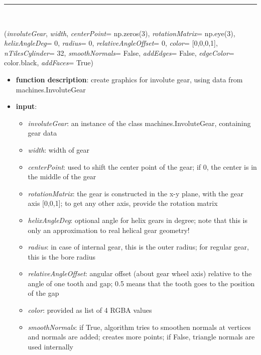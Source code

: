 \begin{itemize}[leftmargin=1.4cm]
\begin{itemize}[leftmargin=1.4cm]
\begin{itemize}[leftmargin=1.4cm]
\begin{itemize}[leftmargin=0.5cm]
\begin{itemize}[leftmargin=1.4cm]
\begin{itemize}[leftmargin=1.4cm]
\begin{itemize}[leftmargin=1.4cm]
\begin{itemize}[leftmargin=0.5cm]
\begin{itemize}[leftmargin=1.4cm]
%
\noindent\rule{8cm}{0.75pt}\vspace{1pt} \\ 
\begin{flushleft}
\label{sec:graphics:InvoluteGear}
({\it involuteGear}, {\it width}, {\it centerPoint}= np.zeros(3), {\it rotationMatrix}= np.eye(3), {\it helixAngleDeg}= 0, {\it radius}= 0, {\it relativeAngleOffset}= 0, {\it color}= [0,0,0,1], {\it nTilesCylinder}= 32, {\it smoothNormals}= False, {\it addEdges}= False, {\it edgeColor}= color.black, {\it addFaces}= True)
\end{flushleft}
\setlength{\itemindent}{0.7cm}
\begin{itemize}[leftmargin=0.7cm]
\item[--]
{\bf function description}: create graphics for involute gear, using data from machines.InvoluteGear
\item[--]
{\bf input}: \vspace{-6pt}
\begin{itemize}[leftmargin=1.2cm]
\setlength{\itemindent}{-0.7cm}
\item[]{\it involuteGear}: an instance of the class machines.InvoluteGear, containing gear data
\item[]{\it width}: width of gear
\item[]{\it centerPoint}: used to shift the center point of the gear; if 0, the center is in the middle of the gear
\item[]{\it rotationMatrix}: the gear is constructed in the x-y plane, with the gear axis [0,0,1]; to get any other axis, provide the rotation matrix
\item[]{\it helixAngleDeg}: optional angle for helix gears in degree; note that this is only an approximation to real helical gear geometry!
\item[]{\it radius}: in case of internal gear, this is the outer radius; for regular gear, this is the bore radius
\item[]{\it relativeAngleOffset}: angular offset (about gear wheel axis) relative to the angle of one tooth and gap; 0.5 means that the tooth goes to the position of the gap
\item[]{\it color}: provided as list of 4 RGBA values
\item[]{\it smoothNormals}: if True, algorithm tries to smoothen normals at vertices and normals are added; creates more points; if False, triangle normals are used internally

\end{itemize}
\end{itemize}
\end{itemize}
\end{itemize}
\end{itemize}
\end{itemize}
\end{itemize}
\end{itemize}
\end{itemize}
\end{itemize}
\end{itemize}
